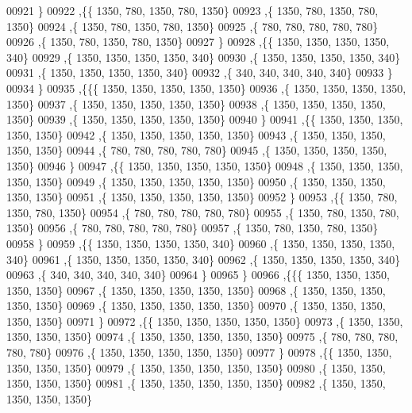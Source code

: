 \begin{DoxyCode}
00921    \}
00922   ,\{\{  1350,   780,  1350,   780,  1350\}
00923    ,\{  1350,   780,  1350,   780,  1350\}
00924    ,\{  1350,   780,  1350,   780,  1350\}
00925    ,\{   780,   780,   780,   780,   780\}
00926    ,\{  1350,   780,  1350,   780,  1350\}
00927    \}
00928   ,\{\{  1350,  1350,  1350,  1350,   340\}
00929    ,\{  1350,  1350,  1350,  1350,   340\}
00930    ,\{  1350,  1350,  1350,  1350,   340\}
00931    ,\{  1350,  1350,  1350,  1350,   340\}
00932    ,\{   340,   340,   340,   340,   340\}
00933    \}
00934   \}
00935  ,\{\{\{  1350,  1350,  1350,  1350,  1350\}
00936    ,\{  1350,  1350,  1350,  1350,  1350\}
00937    ,\{  1350,  1350,  1350,  1350,  1350\}
00938    ,\{  1350,  1350,  1350,  1350,  1350\}
00939    ,\{  1350,  1350,  1350,  1350,  1350\}
00940    \}
00941   ,\{\{  1350,  1350,  1350,  1350,  1350\}
00942    ,\{  1350,  1350,  1350,  1350,  1350\}
00943    ,\{  1350,  1350,  1350,  1350,  1350\}
00944    ,\{   780,   780,   780,   780,   780\}
00945    ,\{  1350,  1350,  1350,  1350,  1350\}
00946    \}
00947   ,\{\{  1350,  1350,  1350,  1350,  1350\}
00948    ,\{  1350,  1350,  1350,  1350,  1350\}
00949    ,\{  1350,  1350,  1350,  1350,  1350\}
00950    ,\{  1350,  1350,  1350,  1350,  1350\}
00951    ,\{  1350,  1350,  1350,  1350,  1350\}
00952    \}
00953   ,\{\{  1350,   780,  1350,   780,  1350\}
00954    ,\{   780,   780,   780,   780,   780\}
00955    ,\{  1350,   780,  1350,   780,  1350\}
00956    ,\{   780,   780,   780,   780,   780\}
00957    ,\{  1350,   780,  1350,   780,  1350\}
00958    \}
00959   ,\{\{  1350,  1350,  1350,  1350,   340\}
00960    ,\{  1350,  1350,  1350,  1350,   340\}
00961    ,\{  1350,  1350,  1350,  1350,   340\}
00962    ,\{  1350,  1350,  1350,  1350,   340\}
00963    ,\{   340,   340,   340,   340,   340\}
00964    \}
00965   \}
00966  ,\{\{\{  1350,  1350,  1350,  1350,  1350\}
00967    ,\{  1350,  1350,  1350,  1350,  1350\}
00968    ,\{  1350,  1350,  1350,  1350,  1350\}
00969    ,\{  1350,  1350,  1350,  1350,  1350\}
00970    ,\{  1350,  1350,  1350,  1350,  1350\}
00971    \}
00972   ,\{\{  1350,  1350,  1350,  1350,  1350\}
00973    ,\{  1350,  1350,  1350,  1350,  1350\}
00974    ,\{  1350,  1350,  1350,  1350,  1350\}
00975    ,\{   780,   780,   780,   780,   780\}
00976    ,\{  1350,  1350,  1350,  1350,  1350\}
00977    \}
00978   ,\{\{  1350,  1350,  1350,  1350,  1350\}
00979    ,\{  1350,  1350,  1350,  1350,  1350\}
00980    ,\{  1350,  1350,  1350,  1350,  1350\}
00981    ,\{  1350,  1350,  1350,  1350,  1350\}
00982    ,\{  1350,  1350,  1350,  1350,  1350\}

\end{DoxyCode}
